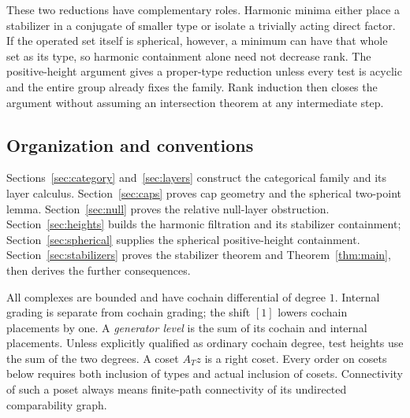 These two reductions have complementary roles. Harmonic minima either
place a stabilizer in a conjugate of smaller type or isolate a trivially
acting direct factor. If the operated set itself is spherical, however,
a minimum can have that whole set as its type, so harmonic containment
alone need not decrease rank. The positive-height argument gives a
proper-type reduction unless every test is acyclic and the entire group
already fixes the family. Rank induction then closes the argument
without assuming an intersection theorem at any intermediate step.

\subsection{Organization and conventions}

Sections~\ref{sec:category} and~\ref{sec:layers} construct the categorical
family and its layer calculus. Section~\ref{sec:caps} proves cap geometry
and the spherical two-point lemma. Section~\ref{sec:null} proves the
relative null-layer obstruction. Section~\ref{sec:heights} builds the
harmonic filtration and its stabilizer containment;
Section~\ref{sec:spherical} supplies the spherical positive-height
containment. Section~\ref{sec:stabilizers} proves the stabilizer theorem
and Theorem~\ref{thm:main}, then derives the further consequences.

All complexes are bounded and have cochain differential of degree $1$.
Internal grading is separate from cochain grading; the shift $[1]$ lowers
cochain placements by one. A \emph{generator level} is the sum of its
cochain and internal placements. Unless explicitly qualified as ordinary
cochain degree, test heights use the sum of the two degrees. A coset
$A_Tz$ is a right coset. Every order on cosets below requires both
inclusion of types and actual inclusion of cosets. Connectivity of such
a poset always means finite-path connectivity of its undirected
comparability graph.
